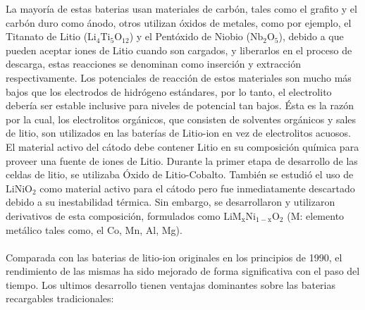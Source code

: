 \documentclass[10pt,a4paper]{article}
\begin{document}
    \noindent La mayoría de estas baterias usan materiales de carbón, 
    tales como el grafito y el carbón duro como ánodo, otros utilizan óxidos de 
    metales, como por ejemplo, el Titanato de Litio ($\mathrm{Li_4Ti_5O_{12}}$) 
    y el Pentóxido de Niobio ($\mathrm{Nb_2O_5}$), debido a que pueden aceptar 
    iones de Litio cuando son cargados, y liberarlos en el proceso de descarga, 
    estas reacciones se denominan como inserción y extracción respectivamente. 
    Los potenciales de reacción de estos materiales son mucho más bajos que los 
    electrodos de hidrógeno estándares, por lo tanto, el electrolito debería ser 
    estable inclusive para niveles de potencial tan bajos. Ésta es la razón por la 
    cual, los electrolitos orgánicos, que consisten de solventes orgánicos y 
    sales de litio, son utilizados en las baterías de Litio-ion en vez de 
    electrolitos acuosos.
	\clearpage
	\noindent El material activo del cátodo debe contener Litio en su composición química 
    para proveer una fuente de iones de Litio. Durante la primer etapa de 
    desarrollo de las celdas de litio, se utilizaba Óxido de Litio-Cobalto.
    También se estudió el uso de $\mathrm{LiNiO_2}$ como 
    material activo para el cátodo pero fue inmediatamente descartado debido a 
    su inestabilidad térmica. Sin embargo, se desarrollaron y utilizaron 
    derivativos de esta composición, formulados como 
    $\mathrm{LiM_xNi_{1-x}O_2}$ (M: elemento metálico tales como, el Co, Mn, 
    Al, Mg).\\
	\\
    Comparada con las baterias de litio-ion originales en los principios de
    1990, el rendimiento de las mismas ha sido mejorado de forma significativa
    con el paso del tiempo. Los ultimos desarrollo tienen ventajas dominantes
    sobre las baterias recargables tradicionales:
\end{document}
